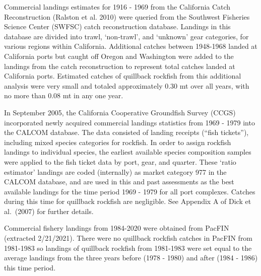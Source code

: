 \documentclass[11pt,
  english,
  a4paper,
]{article}
\begin{document}

Commercial landings estimates for 1916 - 1969 from the California Catch Reconstruction {(Ralston et al. 2010)\leavevmode\tagmcend\tagstructend} were queried from the Southwest Fisheries Science Center (SWFSC) catch reconstruction database. Landings in this database are divided into trawl, `non-trawl', and `unknown' gear categories, for various regions within California. Additional catches between 1948-1968 landed at California ports but caught off Oregon and Washington were added to the landings from the catch reconstruction to represent total catches landed at California ports. Estimated catches of quillback rockfish from this additional analysis were very small and totaled approximately 0.30 mt over all years, with no more than 0.08 mt in any one year.

\leavevmode\tagmcend\tagstructend\par


In September 2005, the California Cooperative Groundfish Survey (CCGS) incorporated newly acquired commercial landings statistics from 1969 - 1979 into the CALCOM database. The data consisted of landing receipts (``fish tickets''), including mixed species categories for rockfish. In order to assign rockfish landings to individual species, the earliest available species composition samples were applied to the fish ticket data by port, gear, and quarter. These `ratio estimator' landings are coded (internally) as market category 977 in the CALCOM database, and are used in this and past assessments as the best available landings for the time period 1969 - 1979 for all port complexes. Catches during this time for quillback rockfish are negligible. See Appendix A of Dick et al.~{(2007)\leavevmode\tagmcend\tagstructend} for further details.

\leavevmode\tagmcend\tagstructend\par


Commercial fishery landings from 1984-2020 were obtained from PacFIN (extracted 2/21/2021). There were no quillback rockfish catches in PacFIN from 1981-1983 so landings of quillback rockfish from 1981-1983 were set equal to the average landings from the three years before (1978 - 1980) and after (1984 - 1986) this time period.
\end{document}
